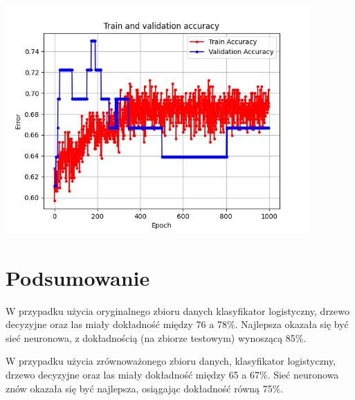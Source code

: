 \documentclass[11pt, a4paper, notitlepage]{report}
\begin{document}
\begin{center}
\includegraphics[width=330pt]{graphics/NeuralNetwork_2}

\end{center}

\chapter{Podsumowanie}
W przypadku użycia oryginalnego zbioru danych klasyfikator logistyczny, drzewo decyzyjne oraz las miały dokładność między 76 a 78\%.
Najlepsza okazała się być sieć neuronowa, z dokładnością (na zbiorze testowym) wynoszącą 85\%.

W przypadku użycia zrównoważonego zbioru danych, klasyfikator logistyczny, drzewo decyzyjne oraz las miały dokładność między 65 a 67\%.
Sieć neuronowa znów okazała się być najlepsza, osiągając dokładność równą 75\%.
\end{document}
